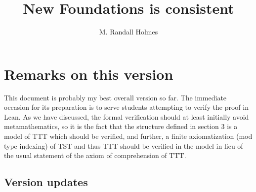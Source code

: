 \documentclass[112pt]{article}
\title{New Foundations is consistent}
\author{M. Randall Holmes}
\begin{document}
\maketitle

\tableofcontents

\newpage


\newpage

\section{Remarks on this version}

This document is probably my best overall version so far.  The immediate occasion for its preparation is to serve students attempting to verify the proof in Lean.  As we have discussed, the formal verification should at least initially avoid metamathematics, so it is the fact that the structure defined in section 3 is a model of TTT which should be verified, and further, a finite axiomatization (mod type indexing) of TST and thus TTT should be verified in the model in lieu of the usual statement of the axiom of comprehension of TTT.

\subsection{Version updates}
\end{document}
